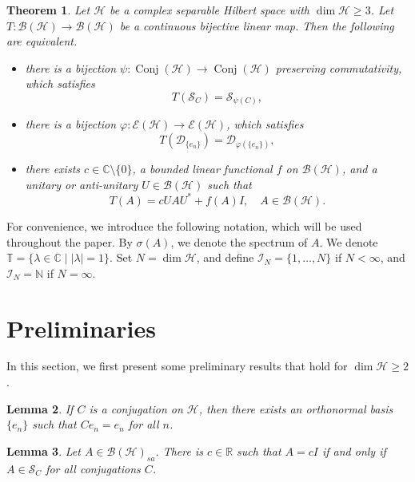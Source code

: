 \documentclass[11pt]{amsart}
\newtheorem{theorem}{Theorem}
\newtheorem{lemma}[theorem]{Lemma}
\theoremstyle{remark}
\newcommand{\BH}{\mathcal{B(H)}}
\newcommand{\cH}{{\mathcal{H}}}
\newcommand{\SC}{\mathcal{S}_C}
\newcommand{\Conj}{\operatorname{Conj}(\cH)}
\begin{document}
\begin{theorem}\label{main}
Let $\cH$ be a complex separable Hilbert space with $\dim \cH \ge 3$.  Let $T: \BH \to \BH$ be a continuous bijective linear map. Then the following are equivalent.
\begin{itemize}
\item[(1)] there is a bijection $\psi: \Conj \to \Conj$ preserving commutativity, which satisfies  
 \[
T(\SC) = {\mathcal{S}_{\psi(C)}},
\]
\item[(2)] there is a bijection $\varphi: \mathcal{E}(\cH) \to \mathcal{E}(\cH)$,  which satisfies  
\[
T(\mathcal{D}_{\{e_n\}}) = \mathcal{D}_{\varphi(\{e_n\})},
\] 
\item[(3)] there exists $c \in \mathbb{C} \setminus \{0\}$, a bounded linear functional $f$ on $\BH$, and a unitary or anti-unitary $U \in \BH$ such that 
\[
T(A)=cUAU^{*}+f(A)I, \quad A \in \BH.
\] 
\end{itemize}
\end{theorem}


For convenience, we introduce the following notation, which will be used throughout the paper. By $\sigma(A)$,  we denote the spectrum of $A$. %
We denote $\mathbb T=\{\lambda\in\mathbb C \mid |\lambda|=1\}$. Set $N=\dim\cH$, and define $\mathcal{I}_N=\{1,\ldots,N\}$ if $N<\infty$,  and $\mathcal{I}_N=\mathbb{N}$ if $N=\infty$.


\section{Preliminaries}
In this section, we first present some preliminary results that hold for $\dim \cH \ge 2$.
\begin{lemma}{\cite[Lemma 1]{GP}}\label{GP1}
If $C$ is a conjugation on $\cH$, then there exists an orthonormal basis $\{e_n\}$ such that $Ce_n=e_n$ for all $n$.
\end{lemma}


\begin{lemma}\label{I}
Let $A \in \BH_{sa}$. There is $c \in \mathbb{R}$ such that $A=cI$ if and only if $A \in \SC$ for all conjugations $C$. 
\end{lemma}
\end{document}
